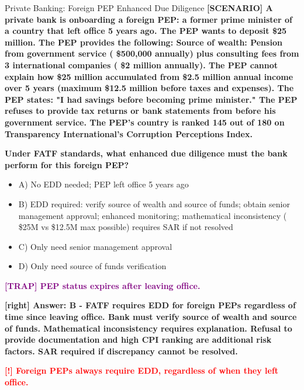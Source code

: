 \documentclass[11pt,a4paper]{beamer}
\newcommand{\redflag}[1]{\textcolor{red}{\textbf{[!] #1}}}
\newcommand{\trap}[1]{\textcolor{purple}{\textbf{[TRAP] #1}}}
\newcommand{\correct}[1]{\textcolor{green!50!black}{\textbf{[right] #1}}}
\newcommand{\scenario}[1]{\textcolor{blue!70!black}{\textbf{[SCENARIO] #1}}}
\begin{document}
	
	\begin{frame}{Private Banking: Foreign PEP Enhanced Due Diligence}
		\tiny
		\scenario{A private bank is onboarding a foreign PEP: a former prime minister of a country that left office 5 years ago. The PEP wants to deposit \$25 million. The PEP provides the following: Source of wealth: Pension from government service ( \$500,000 annually) plus consulting fees from 3 international companies ( \$2 million annually). The PEP cannot explain how \$25 million accumulated from \$2.5 million annual income over 5 years (maximum \$12.5 million before taxes and expenses). The PEP states: "I had savings before becoming prime minister." The PEP refuses to provide tax returns or bank statements from before his government service. The PEP's country is ranked 145 out of 180 on Transparency International's Corruption Perceptions Index.}
		
		\vspace{0.02cm}
		\textbf{Under FATF standards, what enhanced due diligence must the bank perform for this foreign PEP?}
		\vspace{0.02cm}
		
		\begin{itemize}
			\item A) No EDD needed; PEP left office 5 years ago
			\item B) EDD required: verify source of wealth and source of funds; obtain senior management approval; enhanced monitoring; mathematical inconsistency ( \$25M vs \$12.5M max possible) requires SAR if not resolved
			\item C) Only need senior management approval
			\item D) Only need source of funds verification
		\end{itemize}
		
		\vspace{0.02cm}
		\trap{PEP status expires after leaving office.}
		
		\vspace{0.02cm}
		\correct{Answer: B - FATF requires EDD for foreign PEPs regardless of time since leaving office. Bank must verify source of wealth and source of funds. Mathematical inconsistency requires explanation. Refusal to provide documentation and high CPI ranking are additional risk factors. SAR required if discrepancy cannot be resolved.}
		
		\vspace{0.02cm}
		\redflag{Foreign PEPs always require EDD, regardless of when they left office.}
	\end{frame}
	
\end{document}
